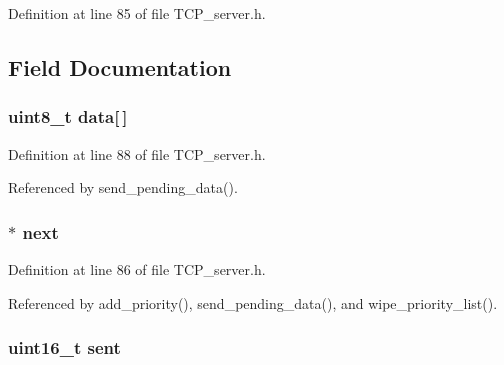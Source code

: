 Definition at line 85 of file T\+C\+P\+\_\+server.\+h.



\subsection{Field Documentation}
\hypertarget{struct_t_c_p___priority___list_a5c239a1bb87b52b0f1d6d68c4749cd2a}{
\subsubsection[{data}]{\setlength{\rightskip}{0pt plus 5cm}uint8\+\_\+t data\mbox{[}$\,$\mbox{]}}}\label{struct_t_c_p___priority___list_a5c239a1bb87b52b0f1d6d68c4749cd2a}


Definition at line 88 of file T\+C\+P\+\_\+server.\+h.



Referenced by send\+\_\+pending\+\_\+data().

\hypertarget{struct_t_c_p___priority___list_ac4565314423a94bcf735245b8b9b4c53}{
\subsubsection[{next}]{$\ast$ next}}\label{struct_t_c_p___priority___list_ac4565314423a94bcf735245b8b9b4c53}


Definition at line 86 of file T\+C\+P\+\_\+server.\+h.



Referenced by add\+\_\+priority(), send\+\_\+pending\+\_\+data(), and wipe\+\_\+priority\+\_\+list().

\hypertarget{struct_t_c_p___priority___list_a61e6f322b3c26ac891710463676b5185}{
\subsubsection[{sent}]{\setlength{\rightskip}{0pt plus 5cm}uint16\+\_\+t sent}}\label{struct_t_c_p___priority___list_a61e6f322b3c26ac891710463676b5185}


